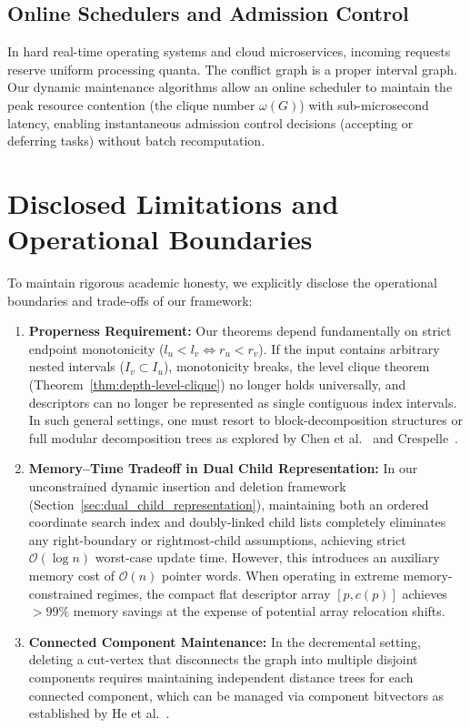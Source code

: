 \subsection{Online Schedulers and Admission Control}
In hard real-time operating systems and cloud microservices, incoming requests reserve uniform processing quanta. The conflict graph is a proper interval graph. Our dynamic maintenance algorithms allow an online scheduler to maintain the peak resource contention (the clique number $\omega(G)$) with sub-microsecond latency, enabling instantaneous admission control decisions (accepting or deferring tasks) without batch recomputation.

\section{Disclosed Limitations and Operational Boundaries}
\label{sec:conclusion_limitations}

To maintain rigorous academic honesty, we explicitly disclose the operational boundaries and trade-offs of our framework:
\begin{enumerate}
    \item \textbf{Properness Requirement:} Our theorems depend fundamentally on strict endpoint monotonicity ($l_u < l_v \iff r_u < r_v$). If the input contains arbitrary nested intervals ($I_v \subset I_u$), monotonicity breaks, the level clique theorem (Theorem~\ref{thm:depth-level-clique}) no longer holds universally, and descriptors can no longer be represented as single contiguous index intervals. In such general settings, one must resort to block-decomposition structures or full modular decomposition trees as explored by Chen et al.~\cite{chen2024distance} and Crespelle~\cite{crespelle2019fully}.
    \item \textbf{Memory--Time Tradeoff in Dual Child Representation:} In our unconstrained dynamic insertion and deletion framework (Section~\ref{sec:dual_child_representation}), maintaining both an ordered coordinate search index and doubly-linked child lists completely eliminates any right-boundary or rightmost-child assumptions, achieving strict $\mathcal{O}(\log n)$ worst-case update time. However, this introduces an auxiliary memory cost of $\mathcal{O}(n)$ pointer words. When operating in extreme memory-constrained regimes, the compact flat descriptor array $[p, c(p)]$ achieves $>99\%$ memory savings at the expense of potential array relocation shifts.
    \item \textbf{Connected Component Maintenance:} In the decremental setting, deleting a cut-vertex that disconnects the graph into multiple disjoint components requires maintaining independent distance trees for each connected component, which can be managed via component bitvectors as established by He et al.~\cite{he2020distance}.
\end{enumerate}

